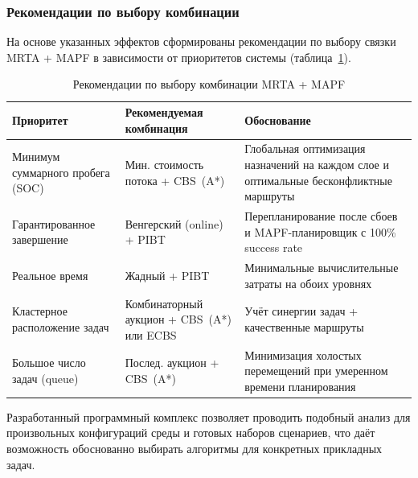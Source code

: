 \subsubsection{Рекомендации по выбору комбинации}

На основе указанных эффектов сформированы рекомендации по выбору связки MRTA + MAPF в зависимости от приоритетов системы (таблица~\ref{tab:combo_recommendations}).

\begin{table}
    \caption{Рекомендации по выбору комбинации MRTA + MAPF}
    \begin{tabularx}{\textwidth}{|p{4.2cm}|p{5cm}|X|}\hline
    Приоритет & Рекомендуемая комбинация & Обоснование \\ \hline
    Минимум суммарного пробега (SOC) & Мин. стоимость потока + CBS~(A*) & Глобальная оптимизация назначений на каждом слое и оптимальные бесконфликтные маршруты \\ \hline
    Гарантированное завершение & Венгерский (online) + PIBT & Перепланирование после сбоев и MAPF-планировщик с 100\% success rate \\ \hline
    Реальное время & Жадный + PIBT & Минимальные вычислительные затраты на обоих уровнях \\ \hline
    Кластерное расположение задач & Комбинаторный аукцион + CBS~(A*) или ECBS & Учёт синергии задач + качественные маршруты \\ \hline
    Большое число задач (queue) & Послед. аукцион + CBS~(A*) & Минимизация холостых перемещений при умеренном времени планирования \\ \hline
    \end{tabularx}
    \label{tab:combo_recommendations}
\end{table}

Разработанный программный комплекс позволяет проводить подобный анализ для произвольных конфигураций среды и готовых наборов сценариев, что даёт возможность обоснованно выбирать алгоритмы для конкретных прикладных задач.
